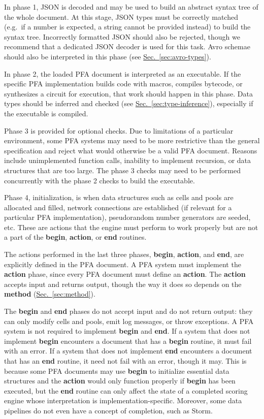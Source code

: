 \documentclass{article}
\newcommand{\PFAc}{\ttfamily\bfseries}
\theoremstyle{definition}
\begin{document}
In phase 1, JSON is decoded and may be used to build an abstract syntax tree of the whole document.  At this stage, JSON types must be correctly matched (e.g.\ if a number is expected, a string cannot be provided instead) to build the syntax tree.  Incorrectly formatted JSON should also be rejected, though we recommend that a dedicated JSON decoder is used for this task.  Avro schemae should also be interpreted in this phase (see \hyperlink{hsec:avro-types}{Sec.~\ref{sec:avro-types}}).

In phase 2, the loaded PFA document is interpreted as an executable.  If the specific PFA implementation builds code with macros, compiles bytecode, or synthesizes a circuit for execution, that work should happen in this phase.  Data types should be inferred and checked (see \hyperlink{hsec:type-inference}{Sec.~\ref{sec:type-inference}}), especially if the executable is compiled.

Phase 3 is provided for optional checks.  Due to limitations of a particular environment, some PFA systems may need to be more restrictive than the general specification and reject what would otherwise be a valid PFA document.  Reasons include unimplemented function calls, inability to implement recursion, or data structures that are too large.  The phase 3 checks may need to be performed concurrently with the phase 2 checks to build the executable.

Phase 4, initialization, is when data structures such as cells and pools are allocated and filled, network connections are established (if relevant for a particular PFA implementation), pseudorandom number generators are seeded, etc.  These are actions that the engine must perform to work properly but are not a part of the {\PFAc begin}, {\PFAc action}, or {\PFAc end} routines.

The actions performed in the last three phases, {\PFAc begin}, {\PFAc action}, and {\PFAc end}, are explicitly defined in the PFA document.  A PFA system must implement the {\PFAc action} phase, since every PFA document must define an {\PFAc action}.  The {\PFAc action} accepts input and returns output, though the way it does so depends on the {\PFAc method} (\hyperlink{hsec:method}{Sec.~\ref{sec:method}}).

The {\PFAc begin} and {\PFAc end} phases do not accept input and do not return output: they can only modify cells and pools, emit log messages, or throw exceptions.  A PFA system is not required to implement {\PFAc begin} and {\PFAc end}.  If a system that does not implement {\PFAc begin} encounters a document that has a {\PFAc begin} routine, it must fail with an error.  If a system that does not implement {\PFAc end} encounters a document that has an {\PFAc end} routine, it need not fail with an error, though it may.  This is because some PFA documents may use {\PFAc begin} to initialize essential data structures and the {\PFAc action} would only function properly if {\PFAc begin} has been executed, but the {\PFAc end} routine can only affect the state of a completed scoring engine whose interpretation is implementation-specific.  Moreover, some data pipelines do not even have a concept of completion, such as Storm.
\end{document}

